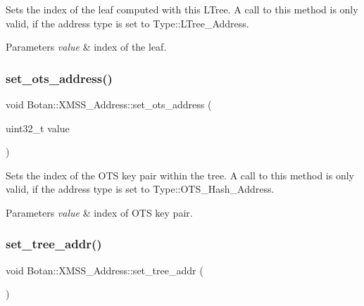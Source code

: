 Sets the index of the leaf computed with this L\+Tree. A call to this method is only valid, if the address type is set to Type\+::\+L\+Tree\+\_\+\+Address.


\begin{DoxyParams}{Parameters}
{\em value} & index of the leaf. \\
\hline
\end{DoxyParams}
\mbox{\label{class_botan_1_1_x_m_s_s___address_a2219e289707137fda458eec819933be9}} 
\subsubsection{\texorpdfstring{set\+\_\+ots\+\_\+address()}{set\_ots\_address()}}
{\footnotesize\ttfamily void Botan\+::\+X\+M\+S\+S\+\_\+\+Address\+::set\+\_\+ots\+\_\+address (\begin{DoxyParamCaption}\item[{uint32\+\_\+t}]{value }\end{DoxyParamCaption})\hspace{0.3cm}{\ttfamily [inline]}}

Sets the index of the O\+TS key pair within the tree. A call to this method is only valid, if the address type is set to Type\+::\+O\+T\+S\+\_\+\+Hash\+\_\+\+Address.


\begin{DoxyParams}{Parameters}
{\em value} & index of O\+TS key pair. \\
\hline
\end{DoxyParams}
\mbox{\label{class_botan_1_1_x_m_s_s___address_af0c3a079be599e10d72e14223f8ea16d}} 
\subsubsection{\texorpdfstring{set\+\_\+tree\+\_\+addr()}{set\_tree\_addr()}}
{\footnotesize\ttfamily void Botan\+::\+X\+M\+S\+S\+\_\+\+Address\+::set\+\_\+tree\+\_\+addr (\begin{DoxyParamCaption}{ }\end{DoxyParamCaption})\hspace{0.3cm}{\ttfamily [inline]}}


